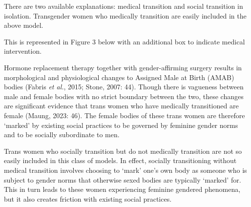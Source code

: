 There are two available explanations: medical transition and social
transition in isolation. Transgender women who medically transition are
easily included in the above model. 

\vspace{0.5em}

\noindent This is represented in Figure 3
below with an additional box to indicate medical intervention.

\vspace{0.5em}

\begin{center}
\caption{Figure 3. Homeostatic mechanisms for the category \emph{women}, who medically transition.}
\end{center}

\noindent Hormone replacement therapy together with gender-affirming surgery
results in morphological and physiological changes to Assigned Male at
Birth (AMAB) bodies (Fabris \emph{et al.}, 2015; Stone, 2007: 44).
Though there is vagueness between male and female bodies with no strict
boundary between the two, these changes are significant evidence that
trans women who have medically transitioned are female (Maung, 2023:
46). The female bodies of these trans women are therefore `marked' by
existing social practices to be governed by feminine gender norms and to
be socially subordinate to men.

Trans women who socially transition but do not medically transition are
not so easily included in this class of models. In effect, socially
transitioning without medical transition involves choosing to `mark'
one's own body as someone who is subject to gender norms that otherwise
sexed bodies are typically `marked' for. This in turn leads to these
women experiencing feminine gendered phenomena, but it also creates
friction with existing social practices. 

